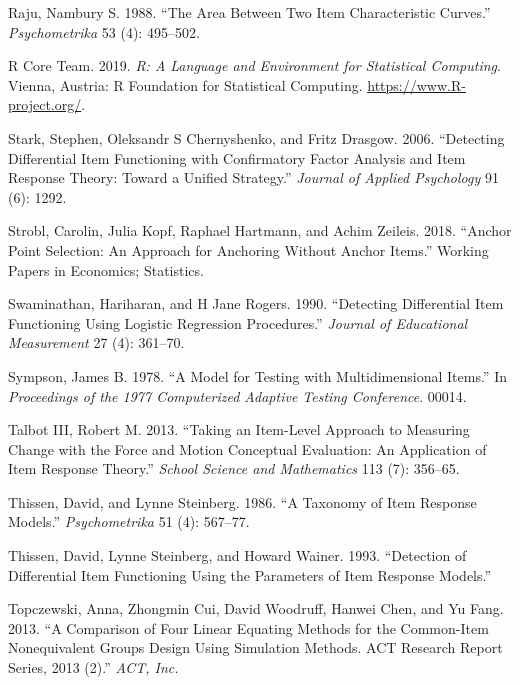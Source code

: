 \documentclass[
  11pt,
]{article}
\begin{document}
\leavevmode\hypertarget{ref-raju1988area}{}%
Raju, Nambury S. 1988. ``The Area Between Two Item Characteristic Curves.'' \emph{Psychometrika} 53 (4): 495--502.

\leavevmode\hypertarget{ref-rcore}{}%
R Core Team. 2019. \emph{R: A Language and Environment for Statistical Computing}. Vienna, Austria: R Foundation for Statistical Computing. \url{https://www.R-project.org/}.

\leavevmode\hypertarget{ref-stark2006detecting}{}%
Stark, Stephen, Oleksandr S Chernyshenko, and Fritz Drasgow. 2006. ``Detecting Differential Item Functioning with Confirmatory Factor Analysis and Item Response Theory: Toward a Unified Strategy.'' \emph{Journal of Applied Psychology} 91 (6): 1292.

\leavevmode\hypertarget{ref-strobl2018anchor}{}%
Strobl, Carolin, Julia Kopf, Raphael Hartmann, and Achim Zeileis. 2018. ``Anchor Point Selection: An Approach for Anchoring Without Anchor Items.'' Working Papers in Economics; Statistics.

\leavevmode\hypertarget{ref-swaminathan1990detecting}{}%
Swaminathan, Hariharan, and H Jane Rogers. 1990. ``Detecting Differential Item Functioning Using Logistic Regression Procedures.'' \emph{Journal of Educational Measurement} 27 (4): 361--70.

\leavevmode\hypertarget{ref-sympson1978model}{}%
Sympson, James B. 1978. ``A Model for Testing with Multidimensional Items.'' In \emph{Proceedings of the 1977 Computerized Adaptive Testing Conference}. 00014.

\leavevmode\hypertarget{ref-talbot2013taking}{}%
Talbot III, Robert M. 2013. ``Taking an Item-Level Approach to Measuring Change with the Force and Motion Conceptual Evaluation: An Application of Item Response Theory.'' \emph{School Science and Mathematics} 113 (7): 356--65.

\leavevmode\hypertarget{ref-thissen1986taxonomy}{}%
Thissen, David, and Lynne Steinberg. 1986. ``A Taxonomy of Item Response Models.'' \emph{Psychometrika} 51 (4): 567--77.

\leavevmode\hypertarget{ref-thissen1993detection}{}%
Thissen, David, Lynne Steinberg, and Howard Wainer. 1993. ``Detection of Differential Item Functioning Using the Parameters of Item Response Models.''

\leavevmode\hypertarget{ref-topczewski2013comparison}{}%
Topczewski, Anna, Zhongmin Cui, David Woodruff, Hanwei Chen, and Yu Fang. 2013. ``A Comparison of Four Linear Equating Methods for the Common-Item Nonequivalent Groups Design Using Simulation Methods. ACT Research Report Series, 2013 (2).'' \emph{ACT, Inc.}
\end{document}
